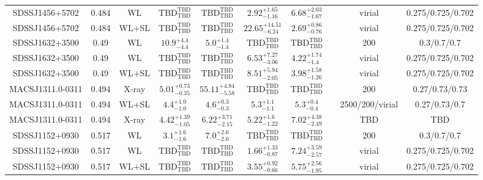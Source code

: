 \begin{table}
\begin{tabular}{cccccccccc}
SDSSJ1456+5702 & 0.484 & WL & ${\mathrm{TBD}}^{\mathrm{TBD}}_{\mathrm{TBD}}$ & ${\mathrm{TBD}}^{\mathrm{TBD}}_{\mathrm{TBD}}$ & ${2.92}^{+1.65}_{-1.16}$ & ${6.68}^{+2.03}_{-1.67}$ & \citet{OG12.1} & virial & 0.275/0.725/0.702 \\
SDSSJ1456+5702 & 0.484 & WL+SL & ${\mathrm{TBD}}^{\mathrm{TBD}}_{\mathrm{TBD}}$ & ${\mathrm{TBD}}^{\mathrm{TBD}}_{\mathrm{TBD}}$ & ${22.65}^{+14.51}_{-6.24}$ & ${2.69}^{+0.86}_{-0.76}$ & \citet{OG12.1} & virial & 0.275/0.725/0.702 \\
SDSSJ1632+3500 & 0.49 & WL & ${10.9}^{+4.4}_{-4.4}$ & ${5.0}^{+1.4}_{-1.4}$ & ${\mathrm{TBD}}^{\mathrm{TBD}}_{\mathrm{TBD}}$ & ${\mathrm{TBD}}^{\mathrm{TBD}}_{\mathrm{TBD}}$ & \citet{SE14.1} & 200 & 0.3/0.7/0.7 \\
SDSSJ1632+3500 & 0.49 & WL & ${\mathrm{TBD}}^{\mathrm{TBD}}_{\mathrm{TBD}}$ & ${\mathrm{TBD}}^{\mathrm{TBD}}_{\mathrm{TBD}}$ & ${6.53}^{+7.27}_{-3.06}$ & ${4.22}^{+1.74}_{-1.4}$ & \citet{OG12.1} & virial & 0.275/0.725/0.702 \\
SDSSJ1632+3500 & 0.49 & WL+SL & ${\mathrm{TBD}}^{\mathrm{TBD}}_{\mathrm{TBD}}$ & ${\mathrm{TBD}}^{\mathrm{TBD}}_{\mathrm{TBD}}$ & ${8.51}^{+5.94}_{-2.05}$ & ${3.98}^{+1.58}_{-1.26}$ & \citet{OG12.1} & virial & 0.275/0.725/0.702 \\
MACSJ1311.0-0311 & 0.494 & X-ray & ${5.01}^{+0.73}_{-0.35}$ & ${55.11}^{+4.84}_{-5.58}$ & ${\mathrm{TBD}}^{\mathrm{TBD}}_{\mathrm{TBD}}$ & ${\mathrm{TBD}}^{\mathrm{TBD}}_{\mathrm{TBD}}$ & \citet{BA14.1} & 200 & 0.27/0.73/0.73 \\
MACSJ1311.0-0311 & 0.494 & WL+SL & ${4.4}^{+1.0}_{-1.0}$ & ${4.6}^{+0.3}_{-0.3}$ & ${5.3}^{+1.1}_{-1.1}$ & ${5.3}^{+0.4}_{-0.4}$ & \citet{ME14.1} & 2500/200/virial & 0.27/0.73/0.7 \\
MACSJ1311.0-0311 & 0.494 & X-ray & ${4.42}^{+1.39}_{-1.05}$ & ${6.22}^{+3.71}_{-2.15}$ & ${5.22}^{+1.6}_{-1.22}$ & ${7.02}^{+4.38}_{-2.49}$ & \citet{SC06.1} & TBD & TBD \\
SDSSJ1152+0930 & 0.517 & WL & ${3.1}^{+1.6}_{-1.6}$ & ${7.0}^{+2.6}_{-2.6}$ & ${\mathrm{TBD}}^{\mathrm{TBD}}_{\mathrm{TBD}}$ & ${\mathrm{TBD}}^{\mathrm{TBD}}_{\mathrm{TBD}}$ & \citet{SE14.1} & 200 & 0.3/0.7/0.7 \\
SDSSJ1152+0930 & 0.517 & WL & ${\mathrm{TBD}}^{\mathrm{TBD}}_{\mathrm{TBD}}$ & ${\mathrm{TBD}}^{\mathrm{TBD}}_{\mathrm{TBD}}$ & ${1.66}^{+1.33}_{-0.87}$ & ${7.24}^{+3.59}_{-2.57}$ & \citet{OG12.1} & virial & 0.275/0.725/0.702 \\
SDSSJ1152+0930 & 0.517 & WL+SL & ${\mathrm{TBD}}^{\mathrm{TBD}}_{\mathrm{TBD}}$ & ${\mathrm{TBD}}^{\mathrm{TBD}}_{\mathrm{TBD}}$ & ${3.55}^{+0.92}_{-0.66}$ & ${5.75}^{+2.56}_{-1.95}$ & \citet{OG12.1} & virial & 0.275/0.725/0.702 \\

\end{tabular}
\end{table}
